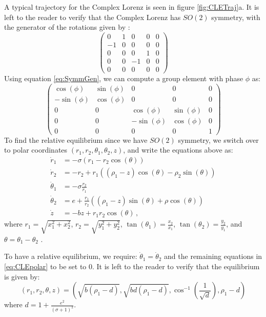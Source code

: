 \documentclass[12 pt]{article}
\begin{document}
A typical trajectory for the Complex Lorenz is seen in figure \ref{fig:CLETraj}a.  It is left to the reader to verify that the Complex Lorenz has $SO(2)$ symmetry, with the generator of the rotations given by \cite{CB}:
\[ \left( \begin{array}{ccccc}
0 & 1 & 0 & 0 & 0 \\
-1 & 0 & 0 & 0 & 0 \\
0 & 0 & 0 & 1 & 0\\
0 & 0 & -1 & 0 & 0 \\
0 & 0 & 0 & 0 & 0\end{array} \right)\]
Using equation \ref{eq:SymmGen}, we can compute a group element with phase $\phi$ as:
\begin{equation}
\left(
\begin{array}{ccccc}
\cos(\phi) & \sin(\phi) & 0 & 0 & 0 \\
-\sin(\phi) & \cos(\phi) & 0 & 0 & 0 \\
0 & 0 & \cos(\phi) & \sin(\phi) & 0\\
0 & 0 & -\sin(\phi) & \cos(\phi) & 0 \\
0 & 0 & 0 & 0 & 1
\end{array}\right)
\end{equation}
To find the relative equilibrium since we have $SO(2)$ symmetry, we switch over to polar coordinates $(r_1, r_2, \theta_1, \theta_2, z)$, and write the equations above as:
\begin{equation}
\begin{split}
  \dot r_1 &= -\sigma(r_1 - r_2\cos(\theta)) \\
  \dot r_2 &=   -r_2 + r_1((\rho_1 - z)\cos(\theta) - \rho_2\sin(\theta)) \\
  \dot \theta_1 &= -\sigma \frac{r_2}{r_1} \\
  \dot \theta_2 &= e + \frac{r_1}{r_2}((\rho_1 - z)\sin(\theta)+\rho\cos(\theta)) \\
  \dot z &= -bz  + r_1r_2\cos(\theta) \,,
    \label{eq:CLEpolar}
\end{split}
\end{equation}
where $r_1 = \sqrt{x_1^2 + x_2^2}$, $r_2 = \sqrt{y_1^2 + y_2^2}$, $\tan(\theta_1) = \frac{x_2}{x_1}$, $\tan(\theta_2) = \frac{y_2}{y_1}$, and $\theta = \theta_1-\theta_2$ \cite{CB}.

To have a relative equilibrium, we require: $\dot \theta_1 = \dot \theta_2$ and the remaining equations in \ref{eq:CLEpolar} to be set to $0$. It is left to the reader to verify that the equilibrium is given by:
\begin{equation}
(r_1, r_2, \theta, z) = (\sqrt{b(\rho_1-d)}, \sqrt{bd(\rho_1-d)}, \cos^{-1}(\frac{1}{\sqrt{d}}), \rho_1 - d)
\end{equation}
where $d = 1+ \frac{e^2}{(\sigma+1)^2}$.
\end{document}
